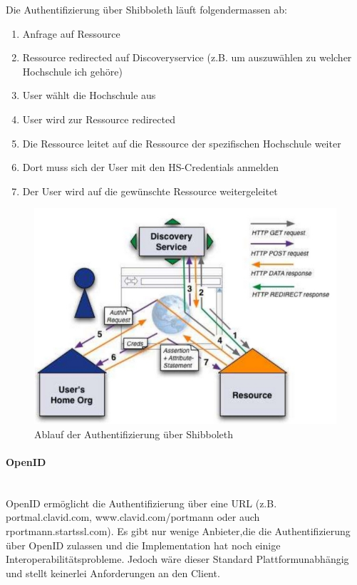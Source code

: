 \documentclass[a4paper, 11pt]{article}
\begin{document}
\vspace{10px}

\noindent Die Authentifizierung über Shibboleth läuft folgendermassen ab:

\begin{enumerate}
	\item Anfrage auf Ressource 
	\item Ressource redirected auf Discoveryservice (z.B. um auszuwählen zu welcher Hochschule ich gehöre) 
	\item User wählt die Hochschule aus 
	\item User wird zur Ressource redirected 
	\item Die Ressource leitet auf die Ressource der spezifischen Hochschule weiter 
	\item Dort muss sich der User mit den HS-Credentials anmelden 
	\item Der User wird auf die gewünschte Ressource weitergeleitet 
\end{enumerate}

\begin{figure}[htb]
	\centering
	\includegraphics[keepaspectratio=true,height=15\baselineskip]{shibboleth.jpg}
	\caption{Ablauf der Authentifizierung über Shibboleth}
	\label{fig:shibboleth}
\end{figure}

\paragraph{OpenID}\mbox{}\\
OpenID ermöglicht die Authentifizierung über eine URL (z.B. portmal.clavid.com, www.clavid.com/portmann oder auch rportmann.startssl.com). Es gibt nur wenige Anbieter,die die Authentifizierung über OpenID zulassen und die Implementation hat noch einige Interoperabilitätsprobleme. Jedoch wäre dieser Standard Plattformunabhängig und stellt keinerlei Anforderungen an den Client.
\end{document}
